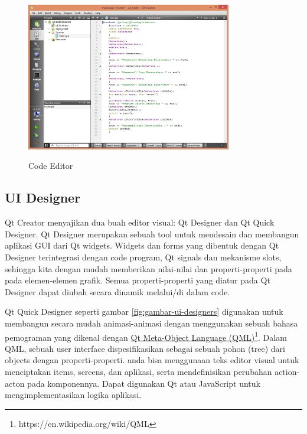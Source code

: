 \begin{figure}[htbp]
\centering
\includegraphics[width=0.8\textwidth]{../manuscript/images/Capture1-2.PNG}
\label{fig:code-editor}
\caption{ Code Editor}
\end{figure}

\subsection{UI Designer}\label{ui-designer}

Qt Creator menyajikan dua buah editor visual: 
Qt Designer  dan Qt Quick
Designer. Qt Designer merupakan sebuah tool untuk mendesain dan
membangun aplikasi GUI dari Qt widgets. Widgets dan forms yang dibentuk
dengan Qt Designer terintegrasi dengan code program, Qt signals dan
mekanisme slots, sehingga kita dengan mudah memberikan nilai-nilai dan
properti-properti pada pada elemen-elemen grafik. Semua
properti-properti yang diatur pada Qt Designer dapat diubah secara
dinamik melalui/di dalam code.

Qt Quick Designer seperti gambar \ref{fig:gambar-ui-designers}
digunakan untuk membangun secara mudah animasi-animasi
dengan menggunakan sebuah bahasa pemograman yang dikenal dengan
\href{https://en.wikipedia.org/wiki/QML}{Qt Meta-Object Language 
(QML)}\footnote{https://en.wikipedia.org/wiki/QML}.
Dalam QML, sebuah user interface dispesifikasikan sebagai sebuah pohon
(tree) dari objects dengan properti-properti. anda bisa menggunaan teks
editor visual untuk menciptakan items, screens, dan aplikasi, serta
mendefinisikan perubahan action-acton pada komponennya. Dapat digunakan
Qt atau JavaScript untuk mengimplementasikan logika aplikasi.

